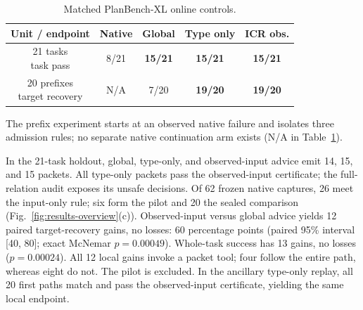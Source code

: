 \begin{table}[t]
\centering\small\setlength{\tabcolsep}{4pt}
\caption{Matched PlanBench-XL online controls.}
\label{tab:online-ablation}
\begin{tabular}{ccccc}\toprule
\textbf{Unit / endpoint} & \textbf{Native} & \textbf{Global} & \textbf{Type only} & \textbf{ICR obs.}\\\midrule
\shortstack{21 tasks\\task pass} & 8/21 & \textbf{15/21} & \textbf{15/21} & \textbf{15/21}\\
\shortstack{20 prefixes\\target recovery} & N/A & 7/20 & \textbf{19/20} & \textbf{19/20}\\
\bottomrule\end{tabular}
\end{table}

The prefix experiment starts at an observed native failure and isolates three
admission rules; no separate native continuation arm exists (N/A in
Table~\ref{tab:online-ablation}).

In the 21-task holdout, global, type-only, and observed-input advice emit 14,
15, and 15 packets. All type-only packets pass the observed-input certificate;
the full-relation audit exposes its unsafe decisions. Of 62 frozen native
captures, 26 meet the input-only rule; six form the pilot and 20 the sealed
comparison (Fig.~\ref{fig:results-overview}(c)). Observed-input versus global
advice yields 12 paired target-recovery gains, no losses: 60 percentage points
(paired 95\% interval [40, 80]; exact McNemar $p=0.00049$). Whole-task success
has 13 gains, no losses ($p=0.00024$). All 12 local gains invoke a packet tool;
four follow the entire path, whereas eight do not. The pilot is excluded.
In the ancillary type-only replay, all 20 first paths match and pass the
observed-input certificate,
yielding the same local endpoint.
